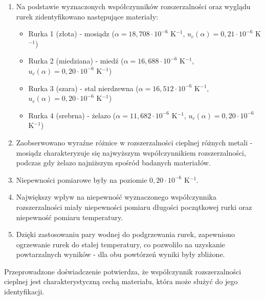 \documentclass[a4paper,12pt]{article}
\begin{document}
\begin{enumerate}

    \item Na podstawie wyznaczonych współczynników rozszerzalności oraz wyglądu rurek zidentyfikowano następujące materiały:
          \begin{itemize}
              \item Rurka 1 (złota) - mosiądz ($\alpha = 18,708 \cdot 10^{-6}$ K$^{-1}$, $u_c(\alpha) = 0{,}21 \cdot 10^{-6}$ K$^{-1}$)
              \item Rurka 2 (miedziana) - miedź ($\alpha = 16,688 \cdot 10^{-6}$ K$^{-1}$, $u_c(\alpha) = 0{,}20 \cdot 10^{-6}$ K$^{-1}$)
              \item Rurka 3 (szara) - stal nierdzewna ($\alpha = 16,512 \cdot 10^{-6}$ K$^{-1}$, $u_c(\alpha) = 0{,}20 \cdot 10^{-6}$ K$^{-1}$)
              \item Rurka 4 (srebrna) - żelazo ($\alpha = 11,682 \cdot 10^{-6}$ K$^{-1}$, $u_c(\alpha) = 0{,}20 \cdot 10^{-6}$ K$^{-1}$)
          \end{itemize}

    \item Zaobserwowano wyraźne różnice w rozszerzalności cieplnej różnych metali - mosiądz charakteryzuje się najwyższym współczynnikiem rozszerzalności, podczas gdy żelazo najniższym spośród badanych materiałów.

    \item Niepewności pomiarowe były na poziomie $0{,}20 \cdot 10^{-6}$ K$^{-1}$.

    \item Największy wpływ na niepewność wyznaczonego współczynnika rozszerzalności miały niepewności pomiaru długości początkowej rurki oraz niepewność pomiaru temperatury.

    \item Dzięki zastosowaniu pary wodnej do podgrzewania rurek, zapewniono ogrzewanie rurek do stałej temperatury, co pozwoliło na uzyskanie powtarzalnych wyników - dla obu powtórzeń wyniki były zbliżone.
\end{enumerate}

Przeprowadzone doświadczenie potwierdza, że współczynnik rozszerzalności cieplnej jest charakterystyczną cechą materiału, która może służyć do jego identyfikacji.




\end{document}
